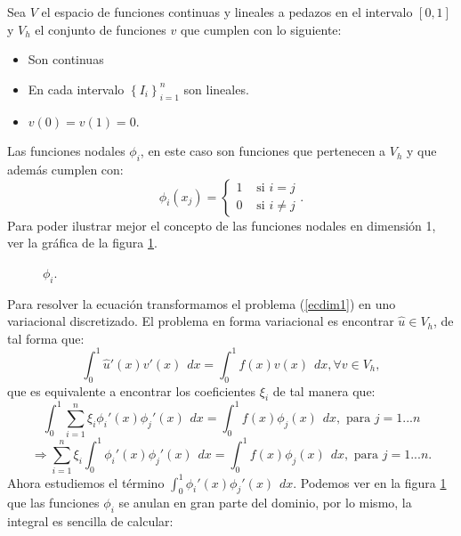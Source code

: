 \documentclass[12pt,spanish,oneside]{book}
\theoremstyle{plain}
\numberwithin{equation}{chapter}
\theoremstyle{definition}
\theoremstyle{remark}
\newcommand{\icu}{\int_0^1}
\newcommand{\dx}{\hspace{5pt} dx}
\newcommand{\llaves}[1]{\left\lbrace #1\right\rbrace}
\begin{document}
Sea $V$ el espacio de funciones continuas y lineales a pedazos en el intervalo $[0,1]$ y $V_h$ el conjunto de funciones $v$ que cumplen con lo siguiente:
 \begin{itemize}
\item Son continuas
\item En cada intervalo $\llaves{I_i}_{i=1}^n$ son lineales.
\item $v(0)=v(1)=0$.
\end{itemize}

Las funciones nodales $\phi_i$, en este caso son funciones que pertenecen a $V_h$ y que además cumplen con: 
\[\phi_i(x_j)=\left\lbrace\begin{array}{cc} 1 & \text{ si } i=j\\ 0&\text{ si }i\neq j\end{array}\right. .\]
Para poder ilustrar mejor el concepto de las funciones nodales en dimensión 1, ver la gráfica de la figura \ref{philineal}.
\begin{figure}[H]
\centering
{}
\caption{$\phi_i$.}
\label{philineal}
\end{figure}
Para resolver la ecuación transformamos el problema (\ref{ecdim1}) en uno variacional discretizado. El problema en forma variacional es encontrar $\hat{u} \in V_h$, de tal forma que:
\[\icu\hat{u}'(x)v'(x)\dx=\icu f(x)v(x)\dx, \forall v \in V_h,\]
que es equivalente a encontrar los coeficientes $\xi_i$ de tal manera que:
\[\icu\sum_{i=1}^n\xi_i \phi_i'(x)\phi_j'(x)\dx=\icu f(x)\phi_j(x)\dx, \text{ para } j=1...n\]
\[\Rightarrow\sum_{i=1}^n\xi_i \icu \phi_i'(x)\phi_j'(x)\dx=\icu f(x)\phi_j(x)\dx, \text{ para } j=1...n. \]
Ahora estudiemos el término $\displaystyle\icu \phi_i'(x)\phi_j'(x)\dx $. Podemos ver en la figura \ref{philineal} que las funciones $\phi_i$ se anulan en gran parte del dominio, por lo mismo, la integral es sencilla de calcular: 
\end{document}
